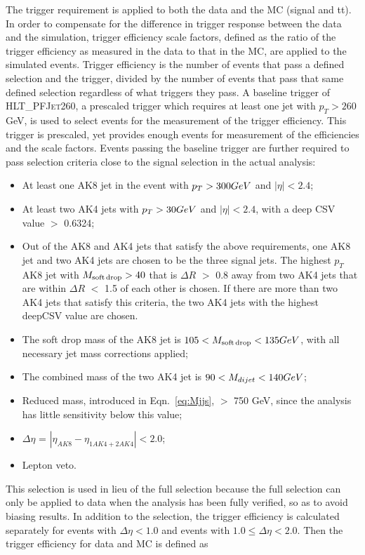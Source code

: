The trigger requirement is applied to both the data and the MC (signal and tt). In order to compensate for the difference in trigger response between the data and the simulation, trigger efficiency scale factors, defined as the ratio of the trigger efficiency as measured in the data to that in the MC, are applied to the simulated events. Trigger efficiency is the number of events that pass a defined selection and the trigger, divided by the number of events that pass that same defined selection regardless of what triggers they pass. A baseline trigger of \textsc{HLT\_PFJet260}, a prescaled trigger which requires at least one jet with $ p_{T} > 260$ GeV, is used to select events for the measurement of the trigger efficiency. This trigger is prescaled, yet provides enough events for measurement of the efficiencies and the scale factors. Events passing the baseline trigger are further required to pass selection criteria close to the signal selection in the actual analysis:
\begin{itemize}
 \item At least one AK8 jet in the event with $p_{T} > 300GeV$ and $|\eta| < 2.4$;
 \item At least two AK4 jets with $p_{T} > 30GeV$ and $|\eta| < 2.4$, with a deep CSV value $>$ 0.6324;
 \item Out of the AK8 and AK4 jets that satisfy the above requirements, one AK8 jet and two AK4 jets are chosen to be the three signal jets. The highest $p_{T}$ AK8 jet with $M_{\rm soft\,drop} > 40$ \GeV that is $\Delta R$ $>$ 0.8 away from two AK4 jets that are within $\Delta R$ $<$ 1.5 of each other is chosen. If there are more than two AK4 jets that satisfy this criteria, the two AK4 jets with the highest deepCSV value are chosen.
 \item The soft drop mass of the AK8 jet is $105 < M_{\rm soft\,drop} < 135GeV$, with all necessary jet mass corrections applied;
 \item The combined mass of the two AK4 jet is $90 < M_{dijet} < 140GeV$;
 \item Reduced mass, introduced in Eqn.~\ref{eq:Mjjs}, $>$ 750 GeV, since the analysis has little sensitivity below this value;
 \item $\Delta\eta$ = $|\eta_{AK8} - \eta_{1AK4 + 2AK4}| < 2.0$;
 \item Lepton veto.
\end{itemize}
This selection is used in lieu of the full selection because the full selection can only be applied to data when the analysis has been fully verified, so as to avoid biasing results. In addition to the selection, the trigger efficiency is calculated separately for events with $\Delta\eta < 1.0$ and events with $1.0 \leq \Delta\eta < 2.0$. Then the trigger efficiency for data and MC is defined as 
